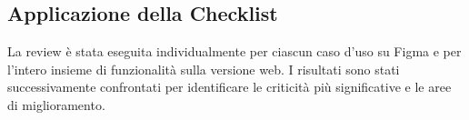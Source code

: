 \subsection*{Applicazione della Checklist}

La review è stata eseguita individualmente per ciascun caso d’uso su Figma e per l’intero insieme di funzionalità sulla versione web.  
I risultati sono stati successivamente confrontati per identificare le criticità più significative e le aree di miglioramento.


